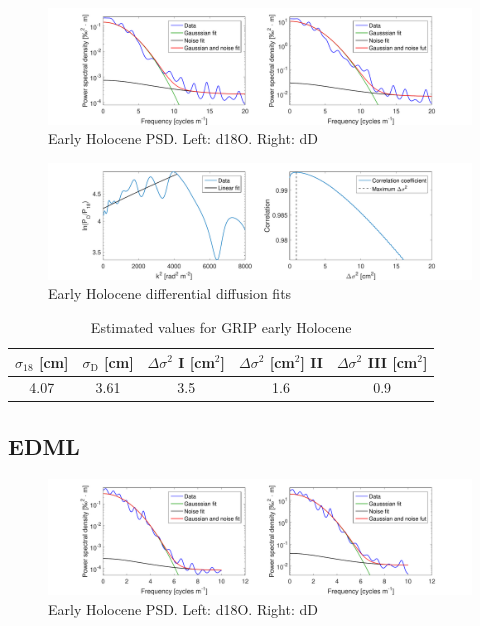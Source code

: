 \documentclass[11pt, draftcls, onecolumn]{IEEEtran} %
\numberwithin{equation}{section}
\numberwithin{table}{section}
\numberwithin{figure}{section}
\begin{document}
\begin{appendices}
\begin{figure}[H]
	\vspace*{2mm}
	\centering
		\includegraphics[width=1\textwidth]{Figure_23}
		\caption{Early Holocene PSD. Left: d18O. Right: dD}  \label{fig:GRIP_early_fig_1}
\end{figure}

\begin{figure}[H]
	\vspace*{2mm}
	\begin{center}
		\includegraphics[width=1\textwidth]{Figure_24}
		\caption{Early Holocene differential diffusion fits}  \label{fig:GRIP_early_fig_2}
	\end{center}
\end{figure}

\begin{table}[H]
	\center
	\caption{Estimated values for GRIP early Holocene}
	\label{GRIP_early_holo}
	\begin{tabular}{c c c c c} 
		\toprule
		$\sigma_{18}$ [cm] & $\sigma_\mathrm{D}$ [cm] & $\Delta\sigma^2$ I [cm$^2$] & $\Delta\sigma^2$ [cm$^2$] II & $\Delta\sigma^2$ III [cm$^2$] \\
		\midrule
		  4.07 &   3.61 &     3.5 &     1.6 &     0.9 \\
		\bottomrule		
	\end{tabular}
\end{table}


\clearpage
\subsection{EDML}

\begin{figure}[H]
	\vspace*{2mm}
	\centering
	\includegraphics[width=1\textwidth]{Figure_29}
	\caption{Early Holocene PSD. Left: d18O. Right: dD}  \label{fig:EDML_fig_1}
\end{figure}


\end{appendices}
\end{document}
